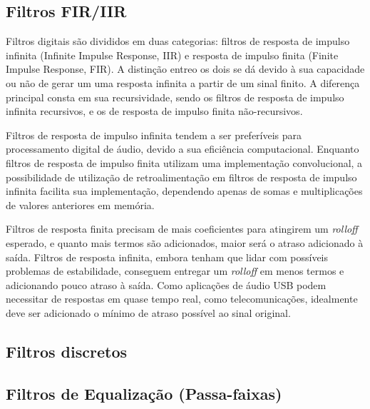 \subsection{Filtros FIR/IIR}

Filtros digitais são divididos em duas categorias: filtros de resposta de impulso infinita (Infinite Impulse Response, IIR) e resposta de impulso finita (Finite Impulse Response, FIR). 
A distinção entreo os dois se dá devido à sua capacidade ou não de gerar um uma resposta infinita a partir de um sinal finito. A diferença principal consta em sua recursividade, sendo os filtros de resposta de impulso infinita recursivos, e os de resposta de impulso finita não-recursivos.


Filtros de resposta de impulso infinita tendem a ser preferíveis para processamento digital de áudio, devido a sua eficiência computacional. Enquanto filtros de resposta de impulso finita utilizam uma implementação convolucional, a possibilidade de utilização de retroalimentação em filtros de resposta de impulso infinita facilita sua implementação, dependendo apenas de somas e multiplicações de valores anteriores em memória.

Filtros de resposta finita precisam de mais coeficientes para atingirem um \textit{rolloff} esperado, e quanto mais termos são adicionados, maior será o atraso adicionado à saída.
Filtros de resposta infinita, embora tenham que lidar com possíveis problemas de estabilidade, conseguem entregar um \textit{rolloff} em menos termos e adicionando pouco atraso à saída. Como aplicações de áudio USB podem necessitar de respostas em quase tempo real, como telecomunicações, idealmente deve ser adicionado o mínimo de atraso possível ao sinal original.
\subsection{Filtros discretos}
\subsection{Filtros de Equalização (Passa-faixas)}


